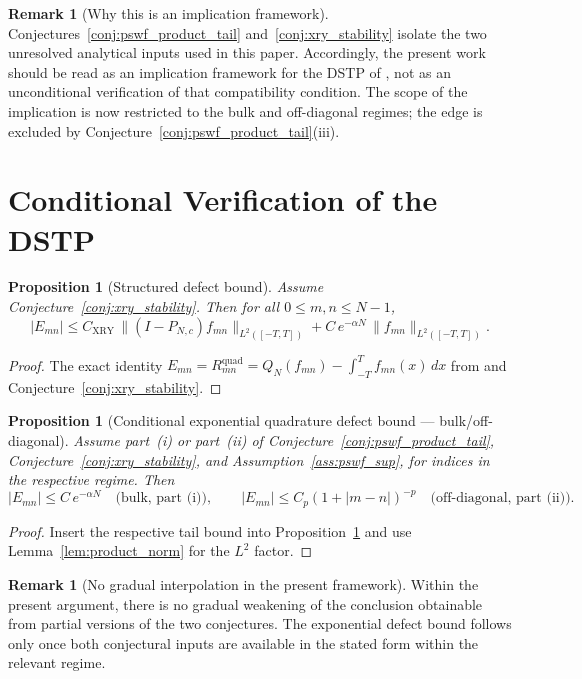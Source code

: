 \documentclass[12pt,a4paper]{amsart}
\newtheorem{proposition}[theorem]{Proposition}
\theoremstyle{definition}
\newtheorem{remark}[theorem]{Remark}
\newcommand{\norm}[1]{\|#1\|}
\newcommand{\PN}{P_{N,c}}
\newcommand{\CXRY}{C_{\mathrm{XRY}}}
\begin{document}
\begin{remark}[Why this is an implication framework]
Conjectures~\ref{conj:pswf_product_tail} and~\ref{conj:xry_stability}
isolate the two unresolved analytical inputs used in this paper.
Accordingly, the present work should be read as an implication framework
for the DSTP of \cite{PaperI}, not as an
unconditional verification of that compatibility condition.
The scope of the implication is now restricted to the bulk and off-diagonal
regimes; the edge is excluded by Conjecture~\ref{conj:pswf_product_tail}(iii).
\end{remark}

\section{Conditional Verification of the DSTP}\label{sec:verification}

\begin{proposition}[Structured defect bound]\label{prop:structured_defect}
Assume Conjecture~\ref{conj:xry_stability}. Then for all $0\le m,n\le N-1$,
\[
  |E_{mn}|
  \le \CXRY\,\|(I-\PN)f_{mn}\|_{L^2([-T,T])}
      + C\,e^{-\alpha N}\,\norm{f_{mn}}_{L^2([-T,T])}.
\]
\end{proposition}
\begin{proof}
The exact identity
$E_{mn}=R_{mn}^{\mathrm{quad}}=Q_N(f_{mn})-\int_{-T}^T f_{mn}(x)\,dx$
from \cite{PaperI} and Conjecture~\ref{conj:xry_stability}.
\end{proof}

\begin{proposition}[Conditional exponential quadrature defect bound
--- bulk/off-diagonal]\label{prop:defect_bound}
Assume part~(i) or part~(ii) of
Conjecture~\ref{conj:pswf_product_tail},
Conjecture~\ref{conj:xry_stability}, and Assumption~\ref{ass:pswf_sup},
for indices in the respective regime.
Then
\[
  |E_{mn}|\le C\,e^{-\alpha N}
  \quad\text{(bulk, part~(i))},
  \qquad
  |E_{mn}|\le C_p(1+|m-n|)^{-p}
  \quad\text{(off-diagonal, part~(ii))}.
\]
\end{proposition}
\begin{proof}
Insert the respective tail bound into
Proposition~\ref{prop:structured_defect} and use
Lemma~\ref{lem:product_norm} for the $L^2$ factor.
\end{proof}

\begin{remark}[No gradual interpolation in the present framework]
Within the present argument, there is no gradual weakening of the
conclusion obtainable from partial versions of the two conjectures. The
exponential defect bound follows only once both conjectural inputs are
available in the stated form within the relevant regime.
\end{remark}
\end{document}
